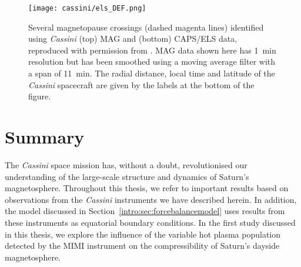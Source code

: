 \begin{figure}
\centering
\noindent\texttt{[image: cassini/els\_DEF.png]}
\caption[CAPS/ELS and MAG data during several magnetopause crossings.]{Several magnetopause crossings (dashed magenta lines) identified using \textit{Cassini} (top) MAG and (bottom) CAPS/ELS data, reproduced with permission from \citet{pilkington2015}. MAG data shown here has \SI{1}{\minute} resolution but has been smoothed using a moving average filter with a span of \SI{11}{\minute}. The radial distance, local time and latitude of the \textit{Cassini} spacecraft are given by the labels at the bottom of the figure.}
\label{cassini:fig:cassini_mp_crossing}
\end{figure}

\section{Summary}
The \textit{Cassini} space mission has, without a doubt, revolutionised our understanding of the large-scale structure and dynamics of Saturn's magnetosphere. Throughout this thesis, we refer to important results based on observations from the \textit{Cassini} instruments we have described herein. In addition, the \citet{achilleos2010a} model discussed in Section~\ref{intro:sec:forcebalancemodel} uses results from these instruments as equatorial boundary conditions. In the first study discussed in this thesis, we explore the influence of the variable hot plasma population detected by the MIMI instrument on the compressibility of Saturn's dayside magnetosphere.